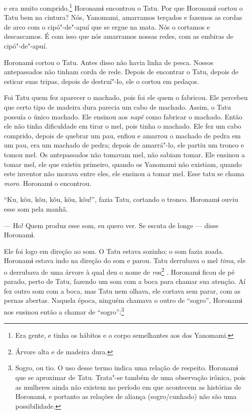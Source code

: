  

 

 

 e era muito comprido.\footnote{   Era gente, e tinha os hábitos e o corpo semelhantes aos dos Yanomami.}  Horonamɨ
encontrou o Tatu. 
Por que Horonamɨ cortou o Tatu bem na cintura? Nós, Yanomami, amarramos
terçados e fazemos as cordas de arco com o cipó"-de"-apuí que se ergue na
mata. Nós o cortamos e descascamos. É com isso que nós amarramos nossas
redes, com as embiras de cipó"-de"-apuí. 

Horonamɨ cortou o Tatu. Antes disso não havia linha de pesca. Nossos
antepassados não tinham corda de rede. Depois de encontrar o Tatu,
depois de esticar suas tripas, depois de destruí"-lo, ele o cortou em
pedaços. 

Foi Tatu quem fez aparecer o machado, pois foi ele quem o fabricou. Ele
percebeu que certo tipo de madeira dura parecia um cabo de machado.
Assim, o Tatu possuía o único machado. Ele ensinou aos \emph{napë} como
fabricar o machado. Então ele não tinha dificuldade em tirar o mel, pois
tinha o machado. Ele fez um cabo comprido, depois de quebrar um pau,
enfiou e amarrou o machado de pedra em um pau, era um machado de pedra;
depois de amarrá"-lo, ele partiu um tronco e tomou mel. Os antepassados
não tomavam mel, não sabiam tomar. Ele ensinou a tomar mel, ele que
existiu primeiro, quando os Yanomami não existiam, quando este inventor
não morava entre eles, ele ensinou a tomar mel. Esse tatu se
chama \emph{moro}. Horonamɨ o encontrou. 

``Ku, kõu, kõu, kõu, kõu, kõu!'', fazia Tatu, cortando o tronco.
Horonamɨ ouviu esse som pela manhã. 

--- Ho! Quem produz esse som, eu quero ver. Se escuta de longe --- disse
Horonamɨ. 

Ele foi logo em direção ao som. O Tatu estava sozinho; o som fazia
zoada. Horonamɨ estava indo na direção do som e parou. Tatu derrubava o
mel \emph{tima}, ele o derrubava de uma árvore à qual deu o nome
de \emph{roa}\footnote{   Árvore alta e de madeira dura.} \emph{.} Horonamɨ ficou de pé parado,
perto de Tatu, fazendo um som com a boca para chamar sua atenção. Aí fez
outro som com a boca, mas Tatu nem olhava, ele cortava sem parar, com as
pernas abertas. Naquela época, ninguém chamava o outro de ``sogro'',
Horonamɨ nos ensinou então a chamar de ``sogro'':\footnote{   Sogro, ou tio. O uso desse termo indica uma relação de respeito.
Horonamɨ que se aproximar de Tatu. Trata"-se também de uma observação
irônica, pois as mulheres ainda não existem no período em que acontecem
as histórias de Horonamɨ, e portanto as relações de aliança
(sogro/cunhado) não são uma possibilidade.}

